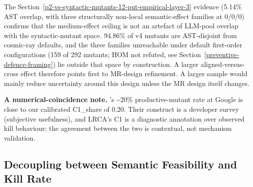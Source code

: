 \documentclass[manuscript,screen,review]{acmart}
\begin{document}
The Section~\ref{p2-vs-syntactic-mutants-12-put-empirical-layer-3} evidence (5.14\% AST overlap, with three structurally non-local semantic-effect families at 0/0/0) confirms that
the medium-effect ceiling is not an artefact of LLM-pool overlap with
the syntactic-mutant space. 94.86\% of v4 mutants are AST-disjoint from
cosmic-ray defaults, and the three families unreachable under default
first-order configurations (159 of 292 mutants; HOM not
refuted, see Section~\ref{preventive-defence-framing}) lie outside that space by construction. A
larger aligned-versus-cross effect therefore points first to MR-design
refinement. A larger sample would mainly reduce uncertainty around this
design unless the MR design itself changes.

\textbf{A numerical-coincidence note.} \citeauthor{1929c365d171c78c9c24b242b5b57e2832bc907b}'s \citeyearpar{1929c365d171c78c9c24b242b5b57e2832bc907b}
\textasciitilde20\% productive-mutant rate at Google is close to our
calibrated C1\_share of 0.20. Their construct is a developer survey
(subjective usefulness), and LRCA's C1 is a diagnostic annotation over
observed kill behaviour; the agreement between the two is contextual,
not mechanism validation.

\subsection{Decoupling between Semantic Feasibility and Kill Rate}\label{decoupling-between-r_sem-and-r_kill}
\end{document}

